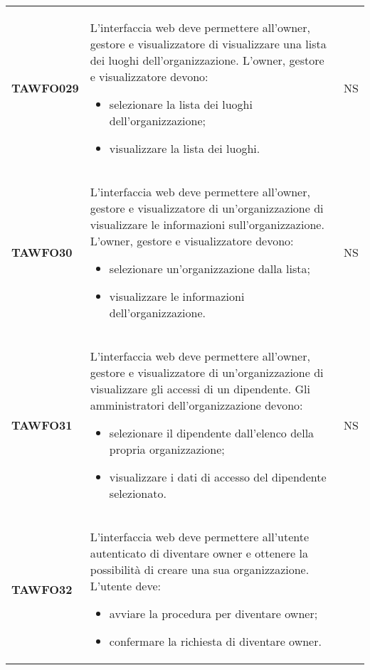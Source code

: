 \documentclass[../piano-di-qualifica.tex]{subfiles}
\begin{document}
\begin{centering}
\begin{longtable}[H]{>{\centering\bfseries}m{3cm} >{}p{10cm} >{\centering\arraybackslash}m{3cm}}
        TAWFO029      & L'interfaccia web deve permettere all'owner, gestore e visualizzatore di visualizzare una lista dei luoghi dell'organizzazione. \newline
                      L'owner, gestore e visualizzatore devono:
                      \begin{itemize}
                      \item selezionare la lista dei luoghi dell'organizzazione;
                      \item visualizzare la lista dei luoghi.
                      \end{itemize}
                      & NS \\
        TAWFO30      & L'interfaccia web deve permettere all'owner, gestore e visualizzatore di un'organizzazione di visualizzare le informazioni sull'organizzazione. \newline
                    L'owner, gestore e visualizzatore devono:
                    \begin{itemize}
                    \item selezionare un'organizzazione dalla lista;
                    \item visualizzare le informazioni dell'organizzazione.
                    \end{itemize}
                    & NS \\
        TAWFO31      & L'interfaccia web deve permettere all'owner, gestore e visualizzatore di un'organizzazione di visualizzare gli accessi di un dipendente. \newline
                  Gli amministratori dell'organizzazione devono:
                  \begin{itemize}
                  \item selezionare il dipendente dall'elenco della propria organizzazione;
                  \item visualizzare i dati di accesso del dipendente selezionato.
                  \end{itemize}
                  & NS \\
        TAWFO32      & L'interfaccia web deve permettere all'utente autenticato di diventare owner e ottenere la possibilità di creare una sua organizzazione. \newline
                  L'utente deve:
                  \begin{itemize}
                  \item avviare la procedura per diventare owner;
                  \item confermare la richiesta di diventare owner.

\end{itemize}
\end{longtable}
\end{centering}
\end{document}

